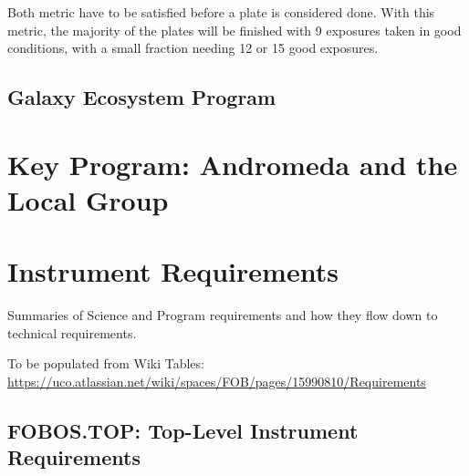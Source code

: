 \documentclass[11pt,a4paper,twoside,onecolumn,openany,final,oldfontcommands]{memoir}
\begin{document}
Both metric have to be satisfied before a plate is considered done. With this metric, the majority of the plates will be finished with 9 exposures taken in good conditions, with a small fraction needing 12 or 15 good exposures. 


\section{Galaxy Ecosystem Program}\label{prog:ecosystem}




\newpage

\chapter{Key Program: Andromeda and the Local Group}\label{prog:localgroup}

\newpage


\chapter{Instrument Requirements}

Summaries of Science and Program requirements and how they flow down to technical requirements.

To be populated from Wiki Tables: \url{https://uco.atlassian.net/wiki/spaces/FOB/pages/15990810/Requirements}

\section{FOBOS.TOP: Top-Level Instrument Requirements}
\end{document}
